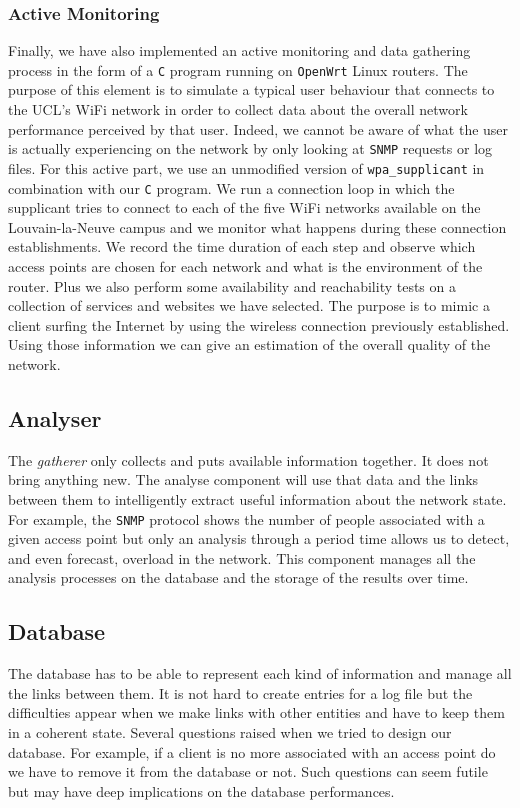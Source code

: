 \subsubsection{Active Monitoring}
Finally, we have also implemented an active monitoring and data gathering process in the form of a \texttt{C} program running on \texttt{OpenWrt} Linux \cite{openwrt} routers. The purpose of this element is to simulate a typical user behaviour that connects to the UCL's WiFi network in order to collect data about the overall network performance perceived by that user. Indeed, we cannot be aware of what the user is actually experiencing on the network by only looking at \texttt{SNMP} requests or log files. For this active part, we use an unmodified version of \texttt{wpa\_supplicant} in combination with our \texttt{C} program. We run a connection loop in which the supplicant tries to connect to each of the five WiFi networks available on the Louvain-la-Neuve campus and we monitor what happens during these connection establishments. We record the time duration of each step and observe which access points are chosen for each network and what is the environment of the router. Plus we also perform some availability and reachability tests on a collection of services and websites we have selected. The purpose is to mimic a client surfing the Internet by using the wireless connection previously established. Using those information we can give an estimation of the overall quality of the network.


\subsection{Analyser}
The \emph{gatherer} only collects and puts available information together. It does not bring anything new. The analyse component will use that data and the links between them to intelligently extract useful information about the network state. For example, the \texttt{SNMP} protocol shows the number of people associated with a given access point but only an analysis through a period time allows us to detect, and even forecast, overload in the network. This component manages all the analysis processes on the database and the storage of the results over time.


\subsection{Database}
The database has to be able to represent each kind of information and manage all the links between them. It is not hard to create entries for a log file but the difficulties appear when we make links with other entities and have to keep them in a coherent state. Several questions raised when we tried to design our database. For example, if a client is no more associated with an access point do we have to remove it from the database or not. Such questions can seem futile but may have deep implications on the database performances. 


